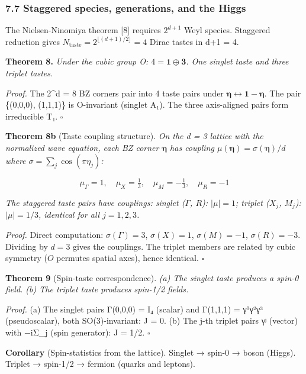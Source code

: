 \documentclass[
  11pt,
]{article}
\begin{document}
\hypertarget{staggered-species-generations-and-the-higgs}{%
\subsubsection{7.7 Staggered species, generations, and the
Higgs}\label{staggered-species-generations-and-the-higgs}}

The Nielsen-Ninomiya theorem {[}8{]} requires \(2^{d+1}\) Weyl species.
Staggered reduction gives
\(N_{\text{taste}} = 2^{\lfloor(d+1)/2\rfloor} = 4\) Dirac tastes in d+1
= 4.

\textbf{Theorem 8.} \emph{Under the cubic group O:
\(4 = \mathbf{1} \oplus \mathbf{3}\). One singlet taste and three
triplet tastes.}

\emph{Proof.} The 2\^{}d = 8 BZ corners pair into 4 taste pairs under
\(\boldsymbol{\eta} \leftrightarrow \mathbf{1} - \boldsymbol{\eta}\).
The pair \{(0,0,0), (1,1,1)\} is O-invariant (singlet A₁). The three
axis-aligned pairs form irreducible T₁. \(\square\)

\textbf{Theorem 8b} (Taste coupling structure). \emph{On the d = 3
lattice with the normalized wave equation, each BZ corner
\(\boldsymbol{\eta}\) has coupling
\(\mu(\boldsymbol{\eta}) = \sigma(\boldsymbol{\eta})/d\) where
\(\sigma = \sum_j \cos(\pi\eta_j)\):}

\[\mu_\Gamma = 1, \quad \mu_X = \tfrac{1}{3}, \quad \mu_M = -\tfrac{1}{3}, \quad \mu_R = -1\]

\emph{The staggered taste pairs have couplings: singlet (\(\Gamma\),
\(R\)): \(|\mu| = 1\); triplet (\(X_j\), \(M_j\)): \(|\mu| = 1/3\),
identical for all \(j = 1, 2, 3\).}

\emph{Proof.} Direct computation: \(\sigma(\Gamma) = 3\),
\(\sigma(X) = 1\), \(\sigma(M) = -1\), \(\sigma(R) = -3\). Dividing by
\(d = 3\) gives the couplings. The triplet members are related by cubic
symmetry (\(O\) permutes spatial axes), hence identical. \(\square\)

\textbf{Theorem 9} (Spin-taste correspondence). \emph{(a) The singlet
taste produces a spin-0 field. (b) The triplet taste produces spin-1/2
fields.}

\emph{Proof.} (a) The singlet pairs Γ(0,0,0) = I₄ (scalar) and Γ(1,1,1)
= γ¹γ²γ³ (pseudoscalar), both SO(3)-invariant: J = 0. (b) The j-th
triplet pairs γʲ (vector) with −iΣ\_j (spin generator): J = 1/2.
\(\square\)

\textbf{Corollary} (Spin-statistics from the lattice). Singlet → spin-0
→ boson (Higgs). Triplet → spin-1/2 → fermion (quarks and leptons).
\end{document}
